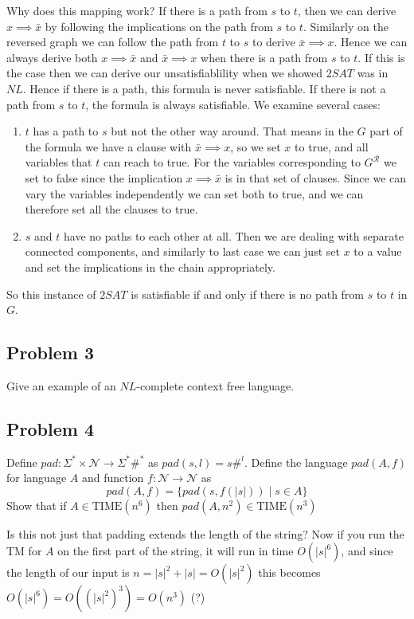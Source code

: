 \documentclass[english]{article}
\begin{document}
Why does this mapping work? 
If there is a path from $s$ to $t$, then we can derive $x \implies \bar{x}$ by following the implications on the path
from $s$ to $t$. Similarly on the reversed graph we can follow the path from $t$ to $s$ to derive
$\bar{x} \implies x$. Hence we can always derive both $x \implies \bar{x}$ and $\bar{x} \implies x$ when there is a
path from $s$ to $t$. If this is the case then we can derive our unsatisfiablility when we showed $2SAT$ was in $NL$.
Hence if there is a path, this formula is never satisfiable. If there is not a path from $s$ to $t$, the formula is
always satisfiable. We examine several cases:
\begin{enumerate}
\item $t$ has a path to $s$ but not the other way around. That means in the $G$ part of the formula we have a clause
  with $\bar{x} \implies x$, so we set $x$ to true, and all variables that $t$ can reach to true. For the variables
  corresponding to $G^\mathcal{R}$ we set to false since the implication $x \implies \bar{x}$ is in that set of
  clauses. Since we can vary the variables independently we can set both to true, and we can therefore set all the 
  clauses to true. 
\item $s$ and $t$ have no paths to each other at all. Then we are dealing with separate connected components, and 
  similarly to last case we can just set $x$ to a value and set the implications in the chain appropriately. 
\end{enumerate}
So this instance of $2SAT$ is satisfiable if and only if there is no path from $s$ to $t$ in $G$. 

\subsection*{Problem 3}
Give an example of an $NL$-complete context free language.

\subsection*{Problem 4}
Define $pad : \Sigma^* \times \mathcal{N} \rightarrow \Sigma^*\#^*$ as $pad(s,l) = s\#^l$. Define
the language $pad(A,f)$ for language $A$ and function $f : \mathcal{N} \rightarrow \mathcal{N}$ as
\[ pad(A,f) = \{ pad(s,f(|s|)) \mid s \in A \} \]
Show that if $A \in \textrm{TIME}(n^6)$ then $pad(A,n^2) \in \textrm{TIME}(n^3)$

Is this not just that padding extends the length of the string? Now if you run the TM for $A$ on the 
first part of the string, it will run in time $O(|s|^6)$, and since the length of our input is
$n = |s|^2 + |s| = O(|s|^2)$ this becomes $O(|s|^6) = O((|s|^2)^3) = O(n^3)$ (?)
\end{document}
